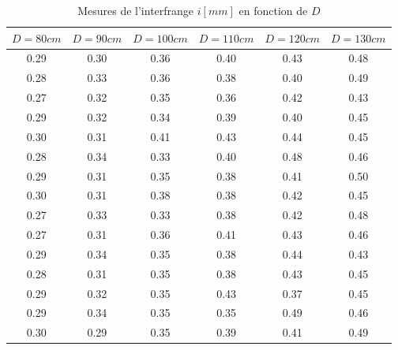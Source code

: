 \documentclass[11pt, openright]{book}
\begin{document}
			\begin{table}[ht!]
				\centering
				\begin{tabular}{|c|c|c|c|c|c|}
					\hline
					$D=80cm$ & $D=90cm$ & $D=100cm$ & $D=110cm$ & $D=120cm$ & $D=130cm$\\
					\hline
					0.29 & 0.30 & 0.36 & 0.40 & 0.43 & 0.48\\
					0.28 & 0.33 & 0.36 & 0.38 & 0.40 & 0.49\\
					0.27 & 0.32 & 0.35 & 0.36 & 0.42 & 0.43\\
					0.29 & 0.32 & 0.34 & 0.39 & 0.40 & 0.45\\
					0.30 & 0.31 & 0.41 & 0.43 & 0.44 & 0.45\\
					0.28 & 0.34 & 0.33 & 0.40 & 0.48 & 0.46\\
					0.29 & 0.31 & 0.35 & 0.38 & 0.41 & 0.50\\
					0.30 & 0.31 & 0.38 & 0.38 & 0.42 & 0.45\\
					0.27 & 0.33 & 0.33 & 0.38 & 0.42 & 0.48\\
					0.27 & 0.31 & 0.36 & 0.41 & 0.43 & 0.46\\
					0.29 & 0.34 & 0.35 & 0.38 & 0.44 & 0.43\\
					0.28 & 0.31 & 0.35 & 0.38 & 0.43 & 0.45\\
					0.29 & 0.32 & 0.35 & 0.43 & 0.37 & 0.45\\
					0.29 & 0.34 & 0.35 & 0.35 & 0.49 & 0.46\\
					0.30 & 0.29 & 0.35 & 0.39 & 0.41 & 0.49\\
					\hline
				\end{tabular}
				\caption{Mesures de l'interfrange $i[mm]$ en fonction de $D$}
			\end{table}
\end{document}

